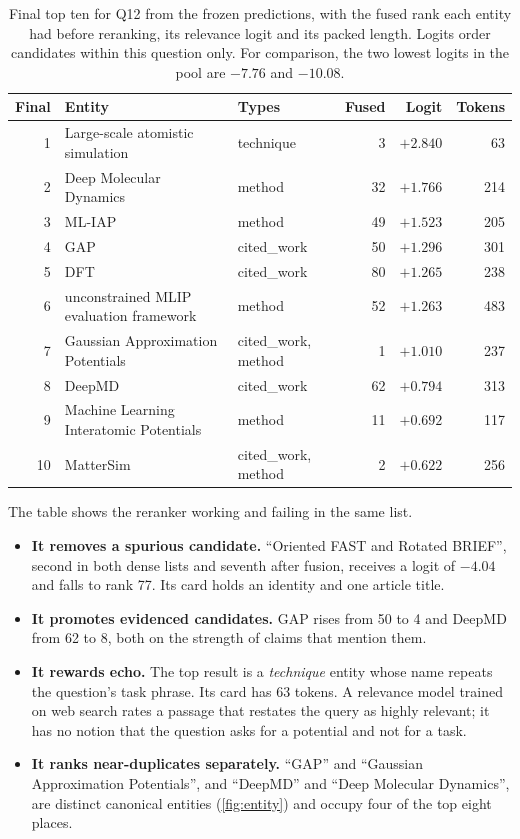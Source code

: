 \documentclass[11pt,a4paper]{article}
\newcommand{\cref}[1]{\autoref{#1}}
\theoremstyle{remark}
\begin{document}
\begin{table}[!htbp]
\centering
\caption[Final top ten for Q12]{Final top ten for Q12 from the frozen predictions, with the fused rank each
entity had before reranking, its relevance logit and its packed length. Logits order
candidates within this question only. For comparison, the two lowest logits in the pool
are $-7.76$ and $-10.08$.}
\label{tab:worked-final}
\small
\begin{tabularx}{\linewidth}{rXlrrr}
\toprule
Final & Entity & Types & Fused & Logit & Tokens\\
\midrule
1 & Large-scale atomistic simulation & technique & 3 & $+2.840$ & 63\\
2 & Deep Molecular Dynamics & method & 32 & $+1.766$ & 214\\
3 & ML-IAP & method & 49 & $+1.523$ & 205\\
4 & GAP & cited\_work & 50 & $+1.296$ & 301\\
5 & DFT & cited\_work & 80 & $+1.265$ & 238\\
6 & unconstrained MLIP evaluation framework & method & 52 & $+1.263$ & 483\\
7 & Gaussian Approximation Potentials & cited\_work, method & 1 & $+1.010$ & 237\\
8 & DeepMD & cited\_work & 62 & $+0.794$ & 313\\
9 & Machine Learning Interatomic Potentials & method & 11 & $+0.692$ & 117\\
10 & MatterSim & cited\_work, method & 2 & $+0.622$ & 256\\
\bottomrule
\end{tabularx}
\end{table}

The table shows the reranker working and failing in the same list.
\begin{itemize}
  \item \textbf{It removes a spurious candidate.} ``Oriented FAST and Rotated BRIEF'', second
        in both dense lists and seventh after fusion, receives a logit of $-4.04$ and falls
        to rank 77. Its card holds an identity and one article title.
  \item \textbf{It promotes evidenced candidates.} GAP rises from 50 to 4 and DeepMD from 62
        to 8, both on the strength of claims that mention them.
  \item \textbf{It rewards echo.} The top result is a \emph{technique} entity whose name
        repeats the question's task phrase. Its card has 63 tokens. A relevance model
        trained on web search rates a passage that restates the query as highly relevant;
        it has no notion that the question asks for a potential and not for a task.
  \item \textbf{It ranks near-duplicates separately.} ``GAP'' and ``Gaussian Approximation
        Potentials'', and ``DeepMD'' and ``Deep Molecular Dynamics'', are distinct canonical
        entities (\cref{fig:entity}) and occupy four of the top eight places.
\end{itemize}
\end{document}

